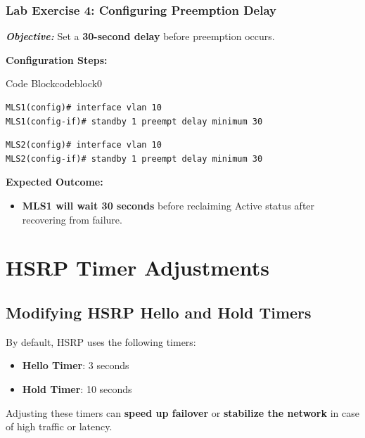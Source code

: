 \documentclass[a4paper]{book}
\begin{document}
\subsubsection{Lab Exercise 4: Configuring Preemption Delay}
\textbf{\textit{Objective:}} Set a \textbf{30-second delay} before preemption occurs.

\vspace{1.5em}

\textbf{Configuration Steps:}


\vspace{1.5em}


\begin{ocg}{Code Block}{codeblock}{0}


\vspace{0.5cm}
\begin{lstlisting}
MLS1(config)# interface vlan 10
MLS1(config-if)# standby 1 preempt delay minimum 30
\end{lstlisting}
\begin{lstlisting}
MLS2(config)# interface vlan 10
MLS2(config-if)# standby 1 preempt delay minimum 30
\end{lstlisting}
\end{ocg}


\textbf{Expected Outcome:}
\begin{itemize}
\item \textbf{MLS1 will wait 30 seconds} before reclaiming Active status after recovering from failure.
\end{itemize}


\vspace{1.5em}

\section{HSRP Timer Adjustments}

\subsection{Modifying HSRP Hello and Hold Timers}
By default, HSRP uses the following timers:
\begin{itemize}
\item \textbf{Hello Timer}: 3 seconds
\item \textbf{Hold Timer}: 10 seconds
\end{itemize}
Adjusting these timers can \textbf{speed up failover} or \textbf{stabilize the network} 
in case of high traffic or latency.
\end{document}
